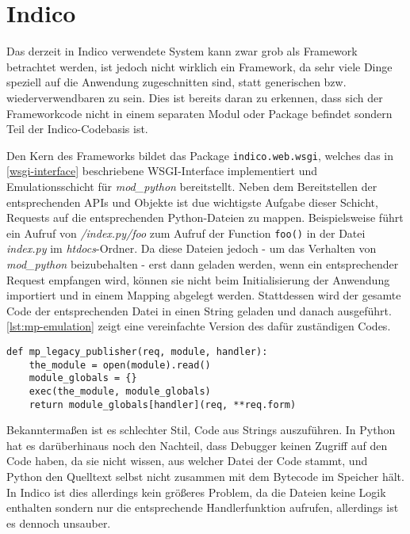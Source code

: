 \section{Indico}\label{frameworks-indico}

Das derzeit in Indico verwendete System kann zwar grob als Framework betrachtet werden, ist jedoch
nicht wirklich ein Framework, da sehr viele Dinge speziell auf die Anwendung zugeschnitten sind,
statt generischen bzw. wiederverwendbaren zu sein. Dies ist bereits daran zu erkennen, dass sich der
Frameworkcode nicht in einem separaten Modul oder Package befindet sondern Teil der Indico-Codebasis
ist.

Den Kern des Frameworks bildet das Package \lstinline{indico.web.wsgi}, welches das in
\autoref{wsgi-interface} beschriebene WSGI-Interface implementiert und Emulationsschicht für
\emph{mod\_python} bereitstellt. Neben dem Bereitstellen der entsprechenden APIs und Objekte ist due
wichtigste Aufgabe dieser Schicht, Requests auf die entsprechenden Python-Dateien zu mappen.
Beispielsweise führt ein Aufruf von \emph{/index.py/foo} zum Aufruf der Function \lstinline{foo()}
in der Datei \emph{index.py} im \emph{htdocs}-Ordner. Da diese Dateien jedoch - um das Verhalten von
\emph{mod\_python} beizubehalten - erst dann geladen werden, wenn ein entsprechender Request
empfangen wird, können sie nicht beim Initialisierung der Anwendung importiert und in einem Mapping
abgelegt werden. Stattdessen wird der gesamte Code der entsprechenden Datei in einen String geladen
und danach ausgeführt. \autoref{lst:mp-emulation} zeigt eine vereinfachte Version des dafür
zuständigen Codes.

\begin{lstlisting}[caption=Laden der Legacy-Python-Dateien,label=lst:mp-emulation]
def mp_legacy_publisher(req, module, handler):
    the_module = open(module).read()
    module_globals = {}
    exec(the_module, module_globals)
    return module_globals[handler](req, **req.form)
\end{lstlisting}

Bekanntermaßen ist es schlechter Stil, Code aus Strings auszuführen. In Python hat es darüberhinaus
noch den Nachteil, dass Debugger keinen Zugriff auf den Code haben, da sie nicht wissen, aus welcher
Datei der Code stammt, und Python den Quelltext selbst nicht zusammen mit dem Bytecode im Speicher
hält. In Indico ist dies allerdings kein größeres Problem, da die Dateien keine Logik enthalten
sondern nur die entsprechende Handlerfunktion aufrufen, allerdings ist es dennoch unsauber.

